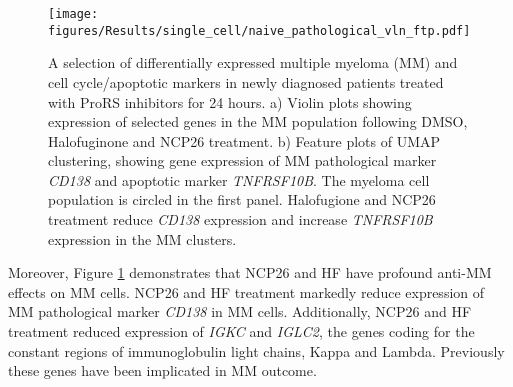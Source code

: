 %
\begin{figure}[htb]
\centering
\texttt{[image: figures/Results/single\_cell/naive\_pathological\_vln\_ftp.pdf]}
\caption[Differentially expressed MM markers- newly diagnosed MM]{A selection of differentially expressed multiple myeloma (MM) and cell cycle/apoptotic markers in newly diagnosed patients treated with ProRS inhibitors for 24 hours.
    a) Violin plots showing expression of selected genes in the MM population following DMSO, Halofuginone and NCP26 treatment.
    b) Feature plots of UMAP clustering, showing gene expression of MM pathological marker \textit{CD138} and apoptotic marker \textit{TNFRSF10B}.
The myeloma cell population is circled in the first panel.
Halofugione and NCP26 treatment reduce \textit{CD138} expression and increase \textit{TNFRSF10B} expression in the MM clusters.}
\label{fig:naive_path_vln_ftp}
\end{figure}

Moreover, Figure \ref{fig:naive_path_vln_ftp} demonstrates that NCP26 and HF have profound anti-MM effects on MM cells.
NCP26 and HF treatment markedly reduce expression of MM pathological marker \textit{CD138} in MM cells.
Additionally, NCP26 and HF treatment reduced expression of \textit{IGKC} and \textit{IGLC2}, the genes coding for the constant regions of immunoglobulin light chains, Kappa and Lambda.
Previously these genes have been implicated in MM outcome.


\clearpage
